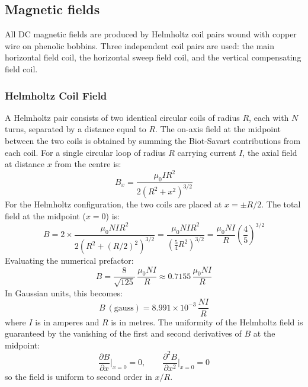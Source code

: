 \subsection{Magnetic fields}

All DC magnetic fields are produced by Helmholtz coil pairs wound with copper wire on
phenolic bobbins. Three independent coil pairs are used: the main horizontal field coil,
the horizontal sweep field coil, and the vertical compensating field coil.
 
\subsubsection*{Helmholtz Coil Field}
 
A Helmholtz pair consists of two identical circular coils of radius $R$, each with $N$
turns, separated by a distance equal to $R$. The on-axis field at the midpoint between
the two coils is obtained by summing the Biot-Savart contributions from each coil.
For a single circular loop of radius $R$ carrying current $I$, the axial field at
distance $x$ from the centre is:
\begin{equation}
    B_x = \frac{\mu_0 I R^2}{2(R^2 + x^2)^{3/2}}
\end{equation}
For the Helmholtz configuration, the two coils are placed at $x = \pm R/2$. The total
field at the midpoint ($x = 0$) is:
\begin{equation}
    B = 2 \times \frac{\mu_0 N I R^2}{2\left(R^2 + (R/2)^2\right)^{3/2}}
      = \frac{\mu_0 N I R^2}{\left(\frac{5}{4}R^2\right)^{3/2}}
      = \frac{\mu_0 N I}{R}\left(\frac{4}{5}\right)^{3/2}
\end{equation}
Evaluating the numerical prefactor:
\begin{equation}
    B = \frac{8}{\sqrt{125}}\,\frac{\mu_0 N I}{R}
      \approx 0.7155\,\frac{\mu_0 N I}{R}
\end{equation}
In Gaussian units, this becomes:
\begin{equation}
    B\ (\text{gauss}) = 8.991\times10^{-3}\,\frac{NI}{R}
\end{equation}
where $I$ is in amperes and $R$ is in metres. The uniformity of the Helmholtz field is
guaranteed by the vanishing of the first and second derivatives of $B$ at the midpoint:
\begin{equation}
    \frac{\partial B}{\partial x}\bigg|_{x=0} = 0,
    \qquad
    \frac{\partial^2 B}{\partial x^2}\bigg|_{x=0} = 0
\end{equation}
so the field is uniform to second order in $x/R$.
 

